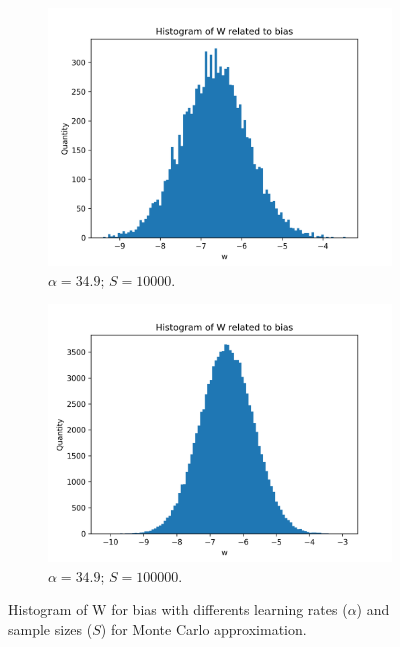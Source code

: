 \documentclass{article}
\begin{document}
\begin{figure}
\begin{subfigure}[t]{0.24\textwidth}
    \includegraphics[width=\linewidth]{hist_featbias_349000000_sample_10000.png}
    \caption{$\alpha = 34.9$; $S = 10000$.}
  \end{subfigure}
  \hfill
  \begin{subfigure}[t]{0.24\textwidth}
    \centering
    \includegraphics[width=\linewidth]{hist_featbias_349000000_sample_100000.png}
    \caption{$\alpha = 34.9$; $S = 100000$.}
  \end{subfigure}
  \caption{Histogram of W for bias with differents learning rates ($\alpha$) and sample sizes ($S$) for Monte Carlo approximation.}
  \label{fig:hist_featbias}
\end{figure}
\end{document}
